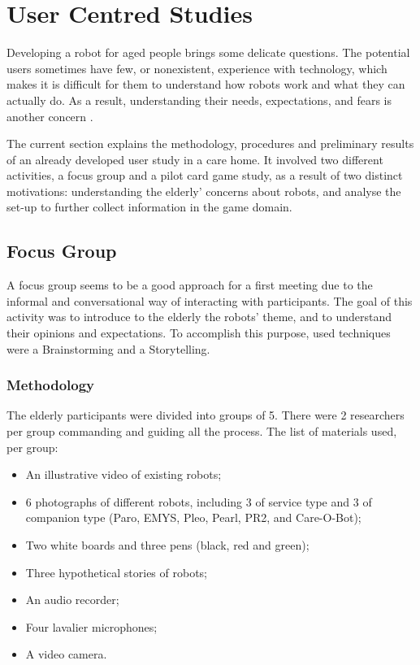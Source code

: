 \section{User Centred Studies} \label{sec:user-studies}

Developing a robot for aged people brings some delicate questions.
The potential users sometimes have few, or nonexistent, experience with technology, which makes it is difficult for them to understand how robots work and what they can actually do.
As a result, understanding their needs, expectations, and fears is another concern \cite{Oliveira}.


The current section explains the methodology, procedures and preliminary results of an already developed user study in a care home.
It involved two different activities, a focus group and a pilot card game study, as a result of two distinct motivations: understanding the elderly' concerns about robots, and analyse the set-up to further collect information in the game domain.






\subsection{Focus Group}

A focus group seems to be a good approach for a first meeting due to the informal and conversational way of interacting with participants.
The goal of this activity was to introduce to the elderly the robots' theme, and to understand their opinions and expectations.
To accomplish this purpose, used techniques were a Brainstorming and a Storytelling.

\subsubsection{Methodology}
The elderly participants were divided into groups of 5.
There were 2 researchers per group commanding and guiding all the process.
The list of materials used, per group:

\begin{itemize}
\item An illustrative video of existing robots;
\item 6 photographs of different robots, including 3 of service type and 3 of companion type (Paro, EMYS, Pleo, Pearl, PR2, and Care-O-Bot);
\item Two white boards and three pens (black, red and green);
\item Three hypothetical stories of robots;
\item An audio recorder;
\item Four lavalier microphones;
\item A video camera.
\end{itemize}

